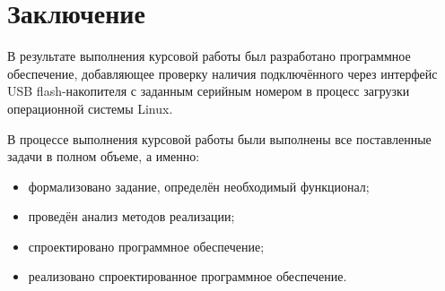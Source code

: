 \chapter*{Заключение}

В результате выполнения курсовой работы был разработано программное обеспечение, добавляющее проверку наличия подключённого через интерфейс USB flash-накопителя с заданным серийным номером в процесс загрузки операционной системы Linux.

В процессе выполнения курсовой работы были выполнены все поставленные задачи в полном объеме, а именно:
\begin{itemize}
	\item формализовано задание, определён необходимый функционал;
	\item проведён анализ методов реализации;
	\item спроектировано программное обеспечение;
	\item реализовано спроектированное программное обеспечение.
\end{itemize}
